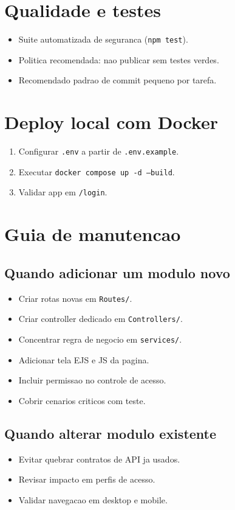 \documentclass[12pt,a4paper]{article}
\begin{document}
\section{Qualidade e testes}
\begin{itemize}[leftmargin=*]
\item Suite automatizada de seguranca (\texttt{npm test}).
\item Politica recomendada: nao publicar sem testes verdes.
\item Recomendado padrao de commit pequeno por tarefa.
\end{itemize}

\section{Deploy local com Docker}
\begin{enumerate}
\item Configurar \texttt{.env} a partir de \texttt{.env.example}.
\item Executar \texttt{docker compose up -d --build}.
\item Validar app em \texttt{/login}.
\end{enumerate}

\section{Guia de manutencao}
\subsection{Quando adicionar um modulo novo}
\begin{itemize}[leftmargin=*]
\item Criar rotas novas em \texttt{Routes/}.
\item Criar controller dedicado em \texttt{Controllers/}.
\item Concentrar regra de negocio em \texttt{services/}.
\item Adicionar tela EJS e JS da pagina.
\item Incluir permissao no controle de acesso.
\item Cobrir cenarios criticos com teste.
\end{itemize}

\subsection{Quando alterar modulo existente}
\begin{itemize}[leftmargin=*]
\item Evitar quebrar contratos de API ja usados.
\item Revisar impacto em perfis de acesso.
\item Validar navegacao em desktop e mobile.
\end{itemize}
\end{document}
